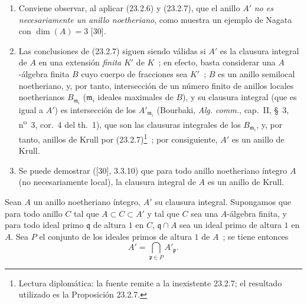 \begin{remarks}[23.2.8]
\label{0.23.2.8-fr}
\begin{enumerate}
  \item[(i)] Conviene observar, al aplicar (23.2.6) y
  (23.2.7), que el anillo $A'$ \emph{no es necesariamente un anillo
  noetheriano}, como muestra un ejemplo de Nagata con $\dim(A)=3$ [30].

  \item[(ii)] Las conclusiones de (23.2.7) siguen siendo válidas si $A'$ es
  la clausura integral de $A$ en una extensión \emph{finita} $K'$ de $K$~; en efecto,
  basta considerar una $A$-álgebra finita $B$ cuyo cuerpo de fracciones sea
  $K'$~; $B$ es un anillo semilocal noetheriano, y, por tanto,
  intersección de un número finito de anillos locales noetherianos
  $B_{\mathfrak m_i}$ ($\mathfrak m_i$ ideales maximales de $B$), y su clausura
  integral (que es igual a $A'$) es intersección de los
  $A'_{\mathfrak m_i}$ (Bourbaki, \emph{Alg. comm.}, cap.~II, §~3,
  n\textsuperscript{o}~3, cor.~4 del th.~1), que son las clausuras integrales
  de los $B_{\mathfrak m_i}$, y, por tanto, anillos de Krull por (23.2.7)\footnote{Lectura diplomática: la fuente remite a la inexistente 23.2.7; el resultado utilizado es la Proposición 23.2.7.}~; por
  consiguiente, $A'$ es un anillo de Krull.

  \item[(iii)] Se puede demostrar ([30], 3.3.10) que para todo anillo noetheriano
  íntegro $A$ (no necesariamente local), la clausura integral de $A$ es un
  anillo de Krull.
\end{enumerate}
\end{remarks}

\begin{corollary}[23.2.9]
\label{0.23.2.9-fr}
Sean $A$ un anillo noetheriano íntegro, $A'$ su clausura integral. Supongamos
que para todo anillo $C$ tal que $A\subset C\subset A'$ y tal que $C$ sea
una $A$-álgebra finita, y para todo ideal primo $\mathfrak q$ de altura $1$
en $C$, $\mathfrak q\cap A$ sea un ideal primo de altura $1$ en $A$.
Sea $P$ el conjunto de los ideales primos de altura $1$ de $A$~; se tiene entonces
\[
  A'=\bigcap_{\mathfrak p\in P}A'_{\mathfrak p}.
\]
\end{corollary}

